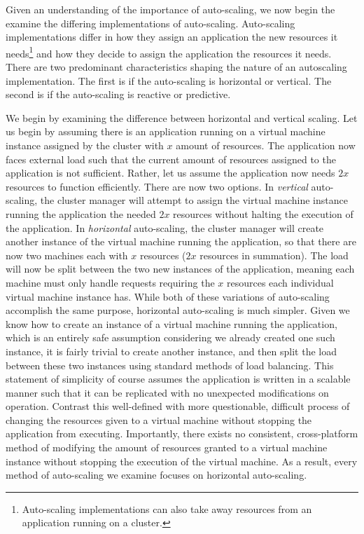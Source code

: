 Given an understanding of the importance of auto-scaling, we now begin the
examine the differing implementations of auto-scaling. Auto-scaling
implementations differ in how they assign an application the new resources it
needs\footnote{Auto-scaling implementations can also take away resources from
an application running on a cluster.} and how they decide to
assign the application the resources it needs.
There are two predominant characteristics shaping the nature of an autoscaling
implementation. The first is if the auto-scaling is horizontal or vertical. The
second is if the auto-scaling is reactive or predictive.

We begin by examining the difference between horizontal and vertical scaling.
Let us begin by assuming there is an application running on a virtual machine
instance assigned by the cluster with $x$ amount of resources. The application
now faces external load such that the current amount of resources assigned to
the application is not sufficient. Rather, let us assume the application now
needs $2x$ resources to function efficiently. There are now two options. In
\textit{vertical} auto-scaling, the cluster manager will attempt to assign the
virtual machine instance running the application the needed $2x$ resources
without halting the execution of the application. In \textit{horizontal}
auto-scaling, the cluster manager will create another instance of the virtual
machine running the application, so that there are now two machines each with
$x$ resources ($2x$ resources in summation). The load will now be split between
the two new instances of the application, meaning each machine must only handle
requests requiring the $x$ resources each individual virtual machine instance
has.\cite[pg.
4]{auto-scaling-techniques-for-elastic-applications-in-cloud-environments} While
both of these variations of auto-scaling accomplish the same purpose, horizontal
auto-scaling is much simpler. Given we know how to create an instance of a
virtual machine running the application, which is an entirely safe assumption
considering we already created one such instance, it is fairly trivial to create
another instance, and then split the load between these two instances using
standard methods of load balancing. This
statement of simplicity of course assumes the application is written in a
scalable manner such that it can be replicated with no unexpected modifications
on operation. Contrast this well-defined with more questionable, difficult
process of changing the resources given to a virtual machine without stopping
the application from executing. Importantly, there exists
no consistent, cross-platform method of
modifying the amount of resources granted to a virtual machine instance without
stopping the execution of the virtual machine. As a result, every method of
auto-scaling we examine focuses on horizontal auto-scaling.\cite[pg.
4]{auto-scaling-techniques-for-elastic-applications-in-cloud-environments}

